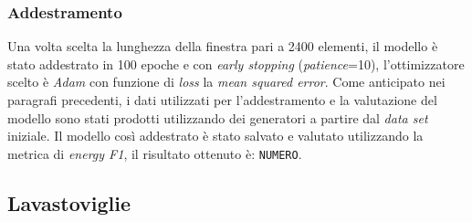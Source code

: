 \documentclass[12pt,a4paper,fleqn]{article}
\begin{document}
\subsubsection{Addestramento}
Una volta scelta la lunghezza della finestra pari a 2400 elementi, il modello è stato addestrato in 100 epoche e con \textsl{early stopping} (\textsl{patience}=10), l'ottimizzatore scelto è \textsl{Adam} con funzione di \textsl{loss} la \textsl{mean squared error}. Come anticipato nei paragrafi precedenti, i dati utilizzati per l'addestramento e la valutazione del modello sono stati prodotti utilizzando dei generatori a partire dal \textsl{data set} iniziale.
Il modello così addestrato è stato salvato e valutato utilizzando la metrica di \textsl{energy F1}, il risultato ottenuto è: \texttt{NUMERO}.

\subsection{Lavastoviglie}


\end{document}
